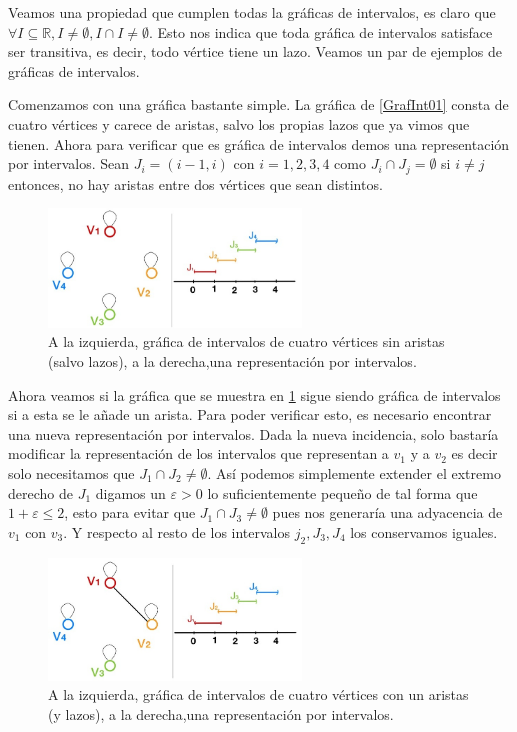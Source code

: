 Veamos una propiedad que cumplen todas la gráficas de intervalos, es claro que $\forall I\subseteq \mathbb{R}, I\neq \emptyset, I\cap I \neq \emptyset$. Esto nos indica que toda gráfica de intervalos satisface ser transitiva, es decir, todo vértice tiene un lazo.
Veamos un par de ejemplos de gráficas de intervalos.


Comenzamos con una gráfica bastante simple. La gráfica de \cref{GrafInt01} consta de cuatro vértices y carece de aristas, salvo los propias lazos que ya vimos que tienen. Ahora para verificar que es gráfica de intervalos demos una representación por intervalos. Sean $J_i = (i-1, i)$ con $i=1,2,3,4$ como $J_i \cap J_j = \emptyset$ si $i\neq j$ entonces,  no hay aristas entre dos vértices que sean distintos.    

\begin{figure}[H]
  \centering
  \includegraphics[width=0.6\textwidth]{recursos/capturas/201}
  \caption{A la izquierda, gráfica de intervalos de cuatro vértices sin aristas (salvo lazos), a la derecha,una representación por intervalos.}
  \label{fig:GrafInt01}
\end{figure}



    \label{exmpl:202}
    Ahora veamos si la gráfica que se muestra en \cref{fig:GrafInt01} sigue siendo gráfica de intervalos si a esta se le añade un arista. Para poder verificar esto, es necesario encontrar una nueva representación por intervalos.
    Dada la nueva incidencia, solo bastaría modificar la representación de los intervalos que representan a $v_1 $ y a $v_2$ es decir solo necesitamos que $J_1 \cap J_2 \neq \emptyset$.
    Así podemos simplemente extender el extremo derecho de $J_1$ digamos un $\varepsilon >0 $ lo suficientemente pequeño de tal forma que $1+\varepsilon \leq 2$, esto para evitar que $J_1 \cap J_3 \neq \emptyset$ pues nos generaría una adyacencia de $v_1 $ con $v_3$. Y respecto al resto de los intervalos $j_2, J_3, J_4$ los conservamos iguales.    


\begin{figure}[H]
  \centering
  \includegraphics[width=0.6\textwidth]{recursos/capturas/202}
  \caption{A la izquierda, gráfica de intervalos de cuatro vértices con un aristas (y lazos), a la derecha,una representación por intervalos.}
  \label{fig:GrafInt02}
\end{figure}


